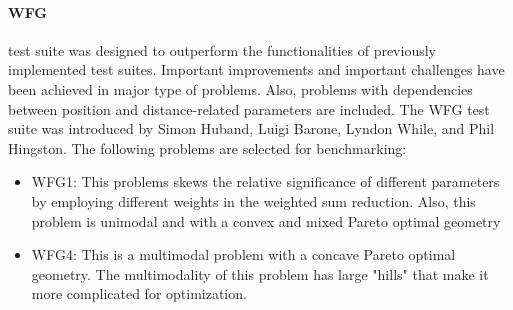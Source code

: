         \paragraph{WFG} test suite \cite{WFGref} was designed to outperform the functionalities of previously implemented test suites. Important improvements and important challenges have been achieved in major type of problems. Also, problems with dependencies between position and distance-related parameters are included. The WFG test suite was introduced by Simon Huband, Luigi Barone, Lyndon While, and Phil Hingston. The following problems are selected for benchmarking:
            \begin{itemize}
                \item WFG1: This problems skews the relative significance of different parameters by employing different weights in the weighted sum reduction. Also, this problem is unimodal and with a convex and mixed Pareto optimal geometry
                \item WFG4: This is a multimodal problem with a concave Pareto optimal geometry. The multimodality of this problem has large "hills" that make it more complicated for optimization. 
            \end{itemize}


